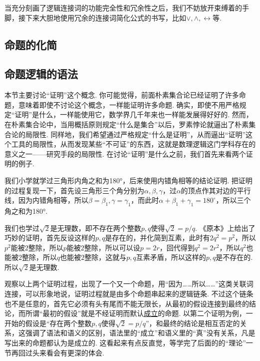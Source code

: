 当充分刻画了逻辑连接词的功能完全性和冗余性之后，我们不妨放开束缚着的手脚，接下来大胆地使用冗余的连接词简化公式的书写，比如\(\vee, \wedge, \leftrightarrow\)等.

\subsection{命题的化简}

\subsection{命题逻辑的语法}

本节主要讨论“证明”这个概念. 你可能觉得，前面朴素集合论已经证明了许多命题，意味着即使不讨论这个概念，一样能证明许多命题. 确实，即使不用严格规定“证明”是什么，一样能使用它，数学界几千年来也一样能发展得好好的. 然而，在朴素集合论中，当用概括原则规定“什么是集合”以后，罗素悖论就逼出了朴素集合论的局限性. 同样地，我们希望通过严格规定“什么是证明”，从而逼出“证明”这个工具的局限性，从而发现某些“不可证”的东西，这就是数理逻辑这门学科存在的意义之一——研究手段的局限性. 在讨论“证明”是什么之前，我们首先来看两个证明的例子.

\begin{reference}
    我们小学就学过三角形内角之和为180°，后来使用内错角相等的结论证明. 把证明的过程复现一下，首先设三角形三个角分别为\(\alpha, \beta, \gamma\)，过\(\alpha\)的顶点作其对边的平行线，因为内错角相等，所以\(\beta = \beta_1, \gamma = \gamma_1\)，而此时\(\alpha + \beta_1 + \gamma_1 = 180^\circ\)，所以三个角之和为180°.
\end{reference}

\begin{reference}
    我们也学过\(\sqrt 2\)是无理数，即不存在两个整数\(p,q\)使得\(\sqrt 2 = p/q\). 《原本》上给出了巧妙的证明，首先反设这样的\(p,q\)是存在的，并化简到互素，此时有\(2q^2=p^2\)，所以\(p^2\)能被\(2\)整除，所以\(p\)能被\(2\)整除，所以可以设\(p=2r\)，回代得到\(q^2=2r^2\)，所以\(q^2\)也能被\(2\)整除，所以\(q\)也能被\(2\)整除，这就与\(p,q\)互素矛盾，所以这样的\(p,q\)是不存在的. 所以\(\sqrt 2\)是无理数.
\end{reference}

观察以上两个证明过程，出现了一个又一个命题，用“因为……所以……”这类关联词连接，可以形象地说，证明过程就是由多个命题串起来的逻辑链条. 不过这个链条也不是任意的，首先它必须有头有尾而不能无限长，从最初的假设连接到最终的结论，而所谓“最初的假设”就是不经证明而默认\underline{成立}的命题. 以第二个证明为例，一开始的假设是“存在两个整数\(p,q\)使得\(\sqrt 2 = p/q\)”，和最终的结论是相互否定的关系，这强调了语法和语义的区别，语法里的“成立”和语义里的“真”没有关系，凡是写出来的命题都认为是成立的. 这看起来有点反直觉，等学完了后面的的“理论”一节再回过头来看会有更深的体会. 


